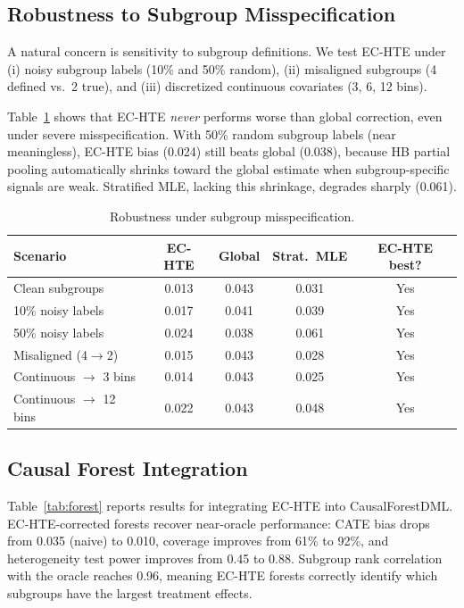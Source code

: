 \documentclass[11pt,a4paper]{article}
\begin{document}
\subsection{Robustness to Subgroup Misspecification}
\label{sec:robustness}

A natural concern is sensitivity to subgroup definitions.
We test EC-HTE under (i) noisy subgroup labels (10\% and 50\% random), (ii) misaligned subgroups (4 defined vs.\ 2 true), and (iii) discretized continuous covariates (3, 6, 12 bins).

Table~\ref{tab:robustness} shows that EC-HTE \emph{never} performs worse than global correction, even under severe misspecification.
With 50\% random subgroup labels (near meaningless), EC-HTE bias (0.024) still beats global (0.038), because HB partial pooling automatically shrinks toward the global estimate when subgroup-specific signals are weak.
Stratified MLE, lacking this shrinkage, degrades sharply (0.061).

\begin{table}[t]
\centering
\small
\caption{Robustness under subgroup misspecification.}
\label{tab:robustness}
\begin{tabular}{l ccc c}
\toprule
Scenario & EC-HTE & Global & Strat.\ MLE & EC-HTE best? \\
\midrule
Clean subgroups       & 0.013 & 0.043 & 0.031 & Yes \\
10\% noisy labels     & 0.017 & 0.041 & 0.039 & Yes \\
50\% noisy labels     & 0.024 & 0.038 & 0.061 & Yes \\
Misaligned (4$\to$2)  & 0.015 & 0.043 & 0.028 & Yes \\
Continuous $\to$ 3 bins & 0.014 & 0.043 & 0.025 & Yes \\
Continuous $\to$ 12 bins & 0.022 & 0.043 & 0.048 & Yes \\
\bottomrule
\end{tabular}
\end{table}

\subsection{Causal Forest Integration}
\label{sec:forest}

Table~\ref{tab:forest} reports results for integrating EC-HTE into CausalForestDML.
EC-HTE-corrected forests recover near-oracle performance: CATE bias drops from 0.035 (naive) to 0.010, coverage improves from 61\% to 92\%, and heterogeneity test power improves from 0.45 to 0.88.
Subgroup rank correlation with the oracle reaches 0.96, meaning EC-HTE forests correctly identify which subgroups have the largest treatment effects.
\end{document}
